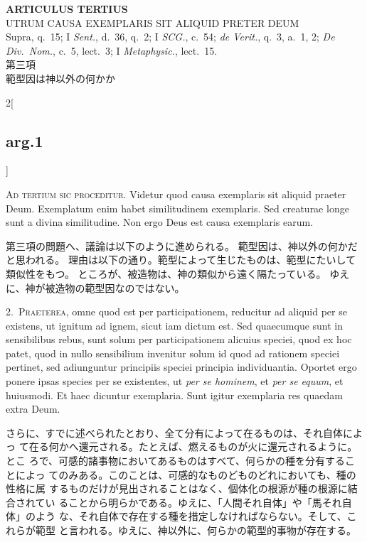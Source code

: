 \documentclass[paper=a4paper,fontsize=10pt,jafontsize=9pt,titlepage]{jlreq}
\begin{document}

\begin{center}
 {\Large {\bfseries ARTICULUS TERTIUS}}\\
 {\large UTRUM CAUSA EXEMPLARIS SIT ALIQUID PRETER DEUM}\\
 {\footnotesize Supra, q.~15; I {\itshape Sent.}, d.~36, q.~2; I
 {\itshape SCG.}, c.~54; {\itshape de Verit.}, q.~3, a.~1, 2; {\itshape
 De Div.~Nom.}, c.~5, lect.~3; I {\itshape Metaphysic.}, lect.~15.}\\
 {\Large 第三項\\範型因は神以外の何かか}
\end{center}

\begin{paracol}{2}[\subsection{arg.1}]

{\huge A}{\scshape d tertium sic proceditur}. Videtur quod
causa exemplaris sit aliquid praeter Deum. Exemplatum enim habet
similitudinem exemplaris. Sed creaturae longe sunt a divina
similitudine. Non ergo Deus est causa exemplaris earum.

\switchcolumn

第三項の問題へ、議論は以下のように進められる。
範型因は、神以外の何かだと思われる。
理由は以下の通り。範型によって生じたものは、範型にたいして類似性をもつ。
ところが、被造物は、神の類似から遠く隔たっている。
ゆえに、神が被造物の範型因なのではない。


2.~{\scshape Praeterea}, omne quod est per participationem, reducitur ad
aliquid per se existens, ut ignitum ad ignem, sicut iam dictum est. Sed
quaecumque sunt in sensibilibus rebus, sunt solum per participationem
alicuius speciei, quod ex hoc patet, quod in nullo sensibilium invenitur
solum id quod ad rationem speciei pertinet, sed adiunguntur principiis
speciei principia individuantia. Oportet ergo ponere ipsas species per
se existentes, ut {\itshape per se hominem}, et {\itshape per se equum},
et huiusmodi. Et haec dicuntur exemplaria. Sunt igitur exemplaria res
quaedam extra Deum.

\switchcolumn

さらに、すでに述べられたとおり、全て分有によって在るものは、それ自体によっ
 て在る何かへ還元される。たとえば、燃えるものが火に還元されるように。とこ
 ろで、可感的諸事物においてあるものはすべて、何らかの種を分有することによっ
 てのみある。このことは、可感的なものどものどれにおいても、種の性格に属
 するものだけが見出されることはなく、個体化の根源が種の根源に結合されてい
 ることから明らかである。ゆえに、「人間それ自体」や「馬それ自体」のよう
 な、それ自体で存在する種を措定しなければならない。そして、これらが範型
 と言われる。ゆえに、神以外に、何らかの範型的事物が存在する。


\end{paracol}
\end{document}
